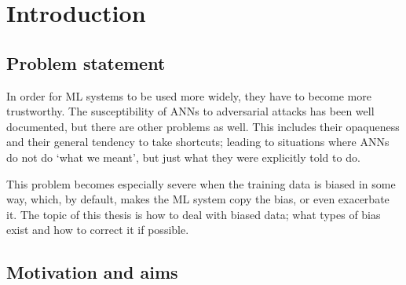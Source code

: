 \chapter{Introduction}\label{ch:introduction}
\section{Problem statement}
In order for \ac{ML} systems to be used more widely,
they have to become more trustworthy.
The susceptibility of \ac{ANNs} to adversarial attacks has been well documented, but there are other problems as well.
This includes their opaqueness and their general tendency to take shortcuts;
leading to situations where \ac{ANNs} do not do `what we meant', but just what they were explicitly told to do.

This problem becomes especially severe when the training data is biased in some way,
which, by default, makes the \ac{ML} system copy the bias, or even exacerbate it.
The topic of this thesis is how to deal with biased data;
what types of bias exist and how to correct it if possible.

\section{Motivation and aims}
